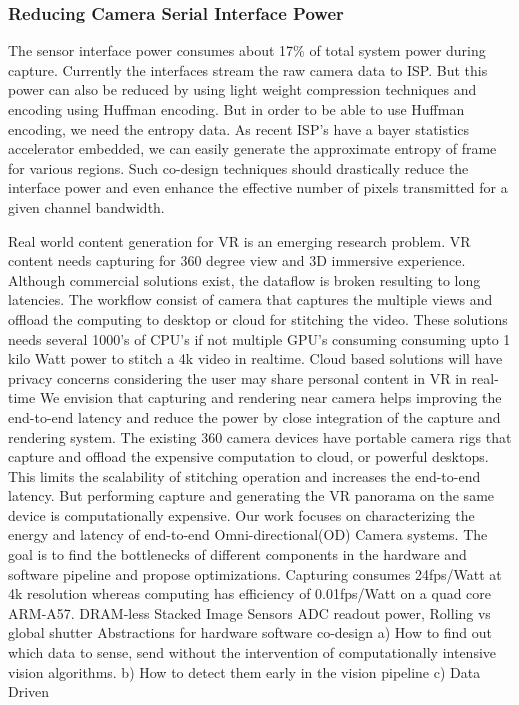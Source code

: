 \subsubsection{Reducing Camera Serial Interface Power}
The sensor interface power consumes about 17\% of total system power during capture. Currently the interfaces stream the raw camera data to ISP. But this power can also be reduced by using light weight compression techniques and encoding using Huffman encoding. But in order to be able to use Huffman encoding, we need the entropy data. As recent ISP's have a bayer statistics accelerator embedded, we can easily generate the approximate entropy of frame for various regions. Such co-design techniques should drastically reduce the interface power and even enhance the effective number of pixels transmitted for a given channel bandwidth. 

Real world content generation for VR is an emerging research problem. VR content needs capturing for 360 degree view and 3D immersive experience. Although commercial solutions exist, the dataflow is broken resulting to long latencies. The workflow consist of camera that captures the multiple views and offload the computing to desktop or cloud for stitching the video. These solutions needs several 1000's of CPU's if not multiple GPU's consuming consuming upto 1 kilo Watt power to stitch a 4k video in realtime. Cloud based solutions will have privacy concerns considering the user may share personal content in VR in real-time We envision that capturing and rendering near camera helps improving the end-to-end latency and reduce the power by close integration of the capture and rendering system. The existing 360 camera devices have portable camera rigs that capture and offload the expensive computation to cloud, or powerful desktops. This limits the scalability of stitching operation  and increases the end-to-end latency. But performing capture and generating the VR panorama on the same device is computationally expensive. 	Our work focuses on characterizing the energy and latency of end-to-end Omni-directional(OD) Camera  systems. The goal is to find the bottlenecks of different components in the hardware and software pipeline and propose optimizations.
Capturing consumes 24fps/Watt at 4k resolution whereas computing has efficiency of 0.01fps/Watt on a quad core ARM-A57.
DRAM-less
Stacked Image Sensors
ADC readout power, Rolling vs global shutter
Abstractions for hardware software co-design
a) How to find out which data to sense, send without the intervention of computationally intensive vision algorithms.
b) How to detect them early in the vision pipeline
c) Data Driven 



